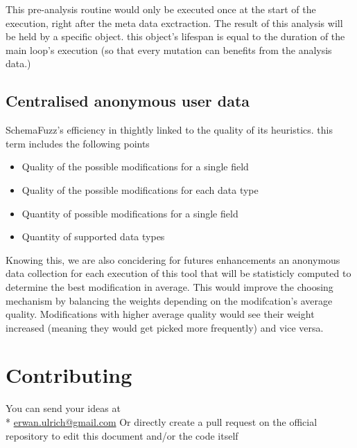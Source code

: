 \documentclass{article}
\begin{document}
\begin{empfile}
This pre-analysis routine would only be executed once at the start of the execution, right after the meta data exctraction. The result of this analysis will be held by a specific object. 
this object's lifespan is equal to the duration of the main loop's execution (so that every mutation can benefits from the analysis data.)
		
		\subsection{Centralised anonymous user data}
SchemaFuzz's efficiency in thightly linked to the quality of its heuristics. this term includes the following points 
		\begin{itemize}
		\item{Quality of the possible modifications for a single field}
		\item{Quality of the possible modifications for each data type}
		\item{Quantity of possible modifications for a single field}
		\item{Quantity of supported data types}
		\end{itemize}
Knowing this, we are also concidering for futures enhancements an anonymous data collection  for each execution of this tool that will be statisticly computed to determine the best modification in average. This would improve the choosing mechanism by balancing the weights  depending on the modifcation's average quality. Modifications with higher average quality would see their weight increased (meaning they would get picked more frequently) and vice versa. 			



	\section{Contributing}
You can send your ideas at  \\*
		\url{erwan.ulrich@gmail.com}
Or directly create a pull request on the official repository to edit this document and/or the code itself
	
	
	
\end{empfile}
\end{document}
